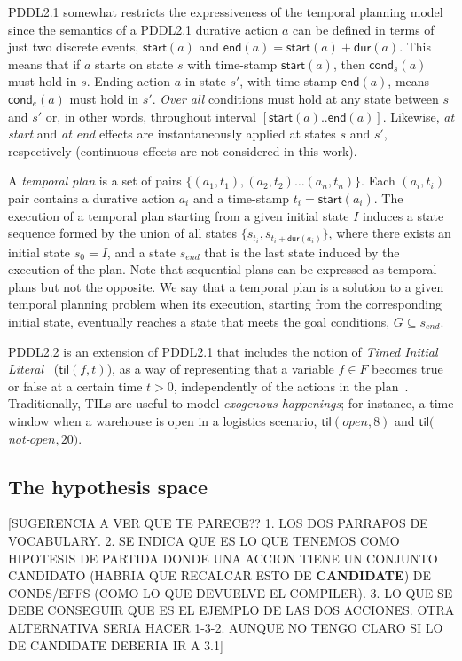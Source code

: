 \documentclass{ecai}
\newcommand{\cond}{\mathsf{cond}}  %
\newcommand{\dur}{\mathsf{dur}}    %
\newcommand{\start}{\mathsf{start}}%
\newcommand{\en}{\mathsf{end}}     %
\newcommand{\til}{\mathsf{til}}    %
\begin{document}
PDDL2.1 somewhat restricts the expressiveness of the temporal planning model since the semantics of a PDDL2.1 durative action $a$ can be defined in terms of just two discrete events, $\start(a)$ and $\en(a)=\start(a)+\dur(a)$. This means that if $a$ starts on state $s$ with time-stamp $\start(a)$, then $\cond_s(a)$ must hold in $s$. Ending action $a$ in state $s'$, with time-stamp $\en(a)$, means $\cond_e(a)$ must hold in $s'$. {\em Over all} conditions must hold at any state between $s$ and $s'$ or, in other words, throughout interval $[\start(a)..\en(a)]$. Likewise, {\em at start} and {\em at end} effects are instantaneously applied at states $s$ and $s'$, respectively (continuous effects are not considered in this work). 

A {\em temporal plan} is a set of pairs $\{(a_1,t_1),(a_2,t_2)\ldots (a_n,t_n)\}$. Each $(a_i,t_i)$ pair contains a durative action $a_i$ and a time-stamp $t_i=\start(a_i)$. The execution of a temporal plan starting from a given initial state $I$ induces a state sequence formed by the union of all states $\{s_{t_i}, s_{t_i+\dur(a_i)}\}$, where there exists an initial state $s_{0}=I$, and a state $s_{end}$ that is the last state induced by the execution of the plan. Note that sequential plans can be expressed as temporal plans but not the opposite. We say that a temporal plan is a solution to a given temporal planning problem when its execution, starting from the corresponding initial state, eventually reaches a state that meets the goal conditions, $G\subseteq s_{end}$.

PDDL2.2 is an extension of PDDL2.1 that includes the notion of {\em Timed Initial Literal}~\cite{hoffmann2005} ($\til(f,t)$), as a way of representing that a variable $f\in F$ becomes true or false at a certain time $t>0$, independently of the actions in the plan~\cite{Edelkamp04}. Traditionally, TILs are useful to model {\em exogenous happenings}; for instance, a time window when a warehouse is open in a logistics scenario, $\til(open,8)$ and $\til($\textit{not-}$open,20)$.



\subsection{The hypothesis space}
\label{sec:action-space}

[SUGERENCIA A VER QUE TE PARECE?? 1. LOS DOS PARRAFOS DE VOCABULARY. 2. SE INDICA QUE ES LO QUE TENEMOS COMO HIPOTESIS DE PARTIDA DONDE UNA ACCION TIENE UN CONJUNTO CANDIDATO (HABRIA QUE RECALCAR ESTO DE \textbf{CANDIDATE}) DE CONDS/EFFS (COMO LO QUE DEVUELVE EL COMPILER). 3. LO QUE SE DEBE CONSEGUIR QUE ES EL EJEMPLO DE LAS DOS ACCIONES. OTRA ALTERNATIVA SERIA HACER 1-3-2. AUNQUE NO TENGO CLARO SI LO DE CANDIDATE DEBERIA IR A 3.1]
\end{document}
